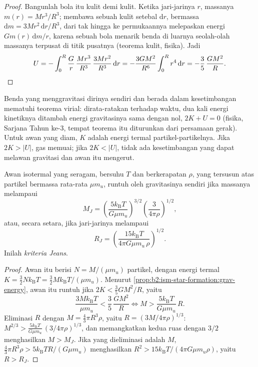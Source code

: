 \begin{proof}
Bangunlah bola itu kulit demi kulit. Ketika jari-jarinya $r$, massanya
$m(r) = M r^3/R^3$; membawa sebuah kulit setebal $\mathrm dr$, bermassa
$\mathrm dm = 3M r^2\,\mathrm dr/R^3$, dari tak hingga ke permukaannya melepaskan
energi $G m(r)\,\mathrm dm/r$, karena sebuah bola menarik benda di luarnya seolah-olah
massanya terpusat di titik pusatnya (teorema kulit, fisika). Jadi
\[
  U = -\int_0^R \frac{G}{r}\,\frac{M r^3}{R^3}\,\frac{3 M r^2}{R^3}\,\mathrm dr
    = -\frac{3 G M^2}{R^6}\int_0^R r^4\,\mathrm dr = -\frac{3}{5}\,\frac{G M^2}{R}.
  \qedhere
\]
\end{proof}

Benda yang menggravitasi dirinya sendiri dan berada dalam kesetimbangan mematuhi teorema
virial: dirata-ratakan terhadap waktu, dua kali energi kinetiknya ditambah energi
gravitasinya sama dengan nol, $2K + U = 0$ (fisika, Sarjana Tahun ke-3, tempat teorema itu
diturunkan dari persamaan gerak). Untuk awan yang diam, $K$ adalah energi termal
partikel-partikelnya. Jika $2K > |U|$, gas memuai; jika $2K < |U|$, tidak ada
kesetimbangan yang dapat melawan gravitasi dan awan itu mengerut.

\begin{proposition}\label{prop:b2:ism-star-formation:jeans}
Awan isotermal yang seragam, bersuhu $T$ dan berkerapatan $\rho$, yang tersusun atas
partikel bermassa rata-rata $\mu m_u$, runtuh oleh gravitasinya sendiri jika massanya
melampaui \emph{}
\[
  M_J = \left(\frac{5 k_{\mathrm B} T}{G\mu m_u}\right)^{3/2}
        \left(\frac{3}{4\pi\rho}\right)^{1/2},
\]
atau, secara setara, jika jari-jarinya melampaui \emph{}
\[
  R_J = \left(\frac{15 k_{\mathrm B} T}{4\pi G\mu m_u\,\rho}\right)^{1/2}.
\]
Inilah \emph{kriteria Jeans}.
\end{proposition}

\begin{proof}
Awan itu berisi $N = M/(\mu m_u)$ partikel, dengan energi termal
$K = \tfrac32 N k_{\mathrm B}T = \tfrac32 M k_{\mathrm B}T/(\mu m_u)$. Menurut
\cref{prop:b2:ism-star-formation:grav-energy}, awan itu runtuh jika
$2K < \tfrac35 GM^2/R$, yaitu
\[
  \frac{3 M k_{\mathrm B} T}{\mu m_u} < \frac{3}{5}\,\frac{G M^2}{R}
  \iff M > \frac{5 k_{\mathrm B} T}{G \mu m_u}\, R .
\]
Eliminasi $R$ dengan $M = \tfrac43\pi R^3\rho$, yaitu $R = (3M/4\pi\rho)^{1/3}$:
$M^{2/3} > \frac{5 k_{\mathrm B}T}{G\mu m_u}\,(3/4\pi\rho)^{1/3}$, dan memangkatkan
kedua ruas dengan $3/2$ menghasilkan $M > M_J$. Jika yang dieliminasi adalah $M$,
$\tfrac43\pi R^3\rho > 5 k_{\mathrm B}T R/(G\mu m_u)$ menghasilkan $R^2 > 15
k_{\mathrm B}T/(4\pi G\mu m_u\rho)$, yaitu $R > R_J$.
\end{proof}


